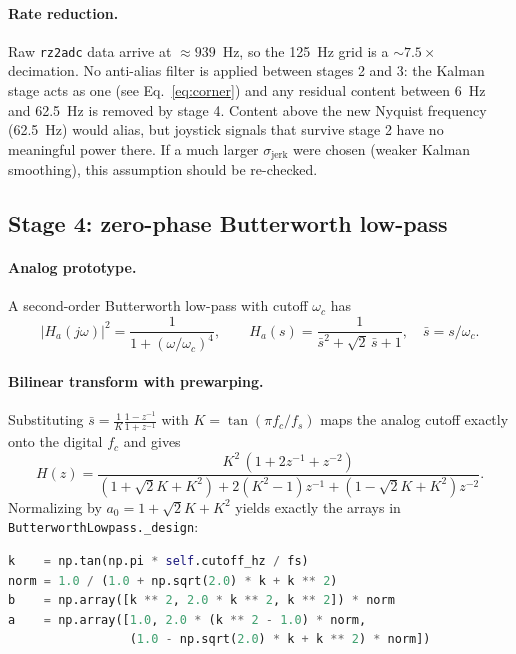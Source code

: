\documentclass[11pt,a4paper]{article}
\newcommand{\code}[1]{\texttt{\small #1}}
\begin{document}
\paragraph{Rate reduction.} Raw \code{rz2adc} data arrive at $\approx 939$~Hz,
so the 125~Hz grid is a $\sim 7.5\times$ decimation. No anti-alias filter is
applied between stages 2 and 3: the Kalman stage acts as one (see
Eq.~\eqref{eq:corner}) and any residual content between 6~Hz and 62.5~Hz is
removed by stage 4. Content above the new Nyquist frequency (62.5~Hz) would
alias, but joystick signals that survive stage 2 have no meaningful power there.
If a much larger $\sigma_{\text{jerk}}$ were chosen (weaker Kalman smoothing),
this assumption should be re-checked.

\subsection{Stage 4: zero-phase Butterworth low-pass}

\paragraph{Analog prototype.} A second-order Butterworth low-pass with cutoff
$\omega_c$ has
\begin{equation}
  |H_a(j\omega)|^2 = \frac{1}{1 + (\omega/\omega_c)^{4}},
  \qquad
  H_a(s) = \frac{1}{\bar s^2 + \sqrt2\,\bar s + 1},
  \quad \bar s = s/\omega_c .
  \label{eq:butter}
\end{equation}

\paragraph{Bilinear transform with prewarping.} Substituting
$\bar s = \frac{1}{K}\frac{1 - z^{-1}}{1 + z^{-1}}$ with
$K = \tan(\pi f_c/f_s)$ maps the analog cutoff exactly onto the digital $f_c$
and gives
\begin{equation}
  H(z) = \frac{K^2\,(1 + 2z^{-1} + z^{-2})}
              {(1 + \sqrt2 K + K^2) + 2(K^2 - 1)z^{-1} + (1 - \sqrt2 K + K^2)z^{-2}} .
  \label{eq:butterz}
\end{equation}
Normalizing by $a_0 = 1 + \sqrt2 K + K^2$ yields exactly the arrays in
\code{ButterworthLowpass.\_design}:

\begin{lstlisting}[language=Python]
k    = np.tan(np.pi * self.cutoff_hz / fs)
norm = 1.0 / (1.0 + np.sqrt(2.0) * k + k ** 2)
b    = np.array([k ** 2, 2.0 * k ** 2, k ** 2]) * norm
a    = np.array([1.0, 2.0 * (k ** 2 - 1.0) * norm,
                 (1.0 - np.sqrt(2.0) * k + k ** 2) * norm])
\end{lstlisting}
\end{document}
